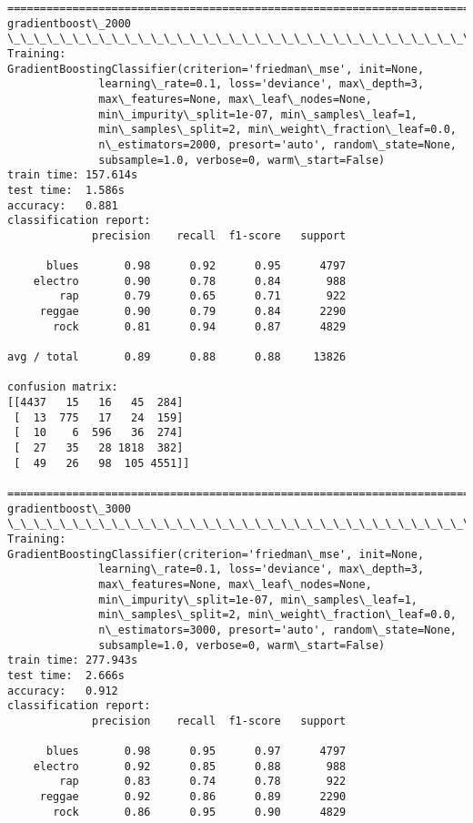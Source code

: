 \documentclass[11pt]{article}
\begin{document}
\begin{Verbatim}[commandchars=\\\{\}]
================================================================================
gradientboost\_2000
\_\_\_\_\_\_\_\_\_\_\_\_\_\_\_\_\_\_\_\_\_\_\_\_\_\_\_\_\_\_\_\_\_\_\_\_\_\_\_\_\_\_\_\_\_\_\_\_\_\_\_\_\_\_\_\_\_\_\_\_\_\_\_\_\_\_\_\_\_\_\_\_\_\_\_\_\_\_\_\_
Training: 
GradientBoostingClassifier(criterion='friedman\_mse', init=None,
              learning\_rate=0.1, loss='deviance', max\_depth=3,
              max\_features=None, max\_leaf\_nodes=None,
              min\_impurity\_split=1e-07, min\_samples\_leaf=1,
              min\_samples\_split=2, min\_weight\_fraction\_leaf=0.0,
              n\_estimators=2000, presort='auto', random\_state=None,
              subsample=1.0, verbose=0, warm\_start=False)
train time: 157.614s
test time:  1.586s
accuracy:   0.881
classification report:
             precision    recall  f1-score   support

      blues       0.98      0.92      0.95      4797
    electro       0.90      0.78      0.84       988
        rap       0.79      0.65      0.71       922
     reggae       0.90      0.79      0.84      2290
       rock       0.81      0.94      0.87      4829

avg / total       0.89      0.88      0.88     13826

confusion matrix:
[[4437   15   16   45  284]
 [  13  775   17   24  159]
 [  10    6  596   36  274]
 [  27   35   28 1818  382]
 [  49   26   98  105 4551]]

================================================================================
gradientboost\_3000
\_\_\_\_\_\_\_\_\_\_\_\_\_\_\_\_\_\_\_\_\_\_\_\_\_\_\_\_\_\_\_\_\_\_\_\_\_\_\_\_\_\_\_\_\_\_\_\_\_\_\_\_\_\_\_\_\_\_\_\_\_\_\_\_\_\_\_\_\_\_\_\_\_\_\_\_\_\_\_\_
Training: 
GradientBoostingClassifier(criterion='friedman\_mse', init=None,
              learning\_rate=0.1, loss='deviance', max\_depth=3,
              max\_features=None, max\_leaf\_nodes=None,
              min\_impurity\_split=1e-07, min\_samples\_leaf=1,
              min\_samples\_split=2, min\_weight\_fraction\_leaf=0.0,
              n\_estimators=3000, presort='auto', random\_state=None,
              subsample=1.0, verbose=0, warm\_start=False)
train time: 277.943s
test time:  2.666s
accuracy:   0.912
classification report:
             precision    recall  f1-score   support

      blues       0.98      0.95      0.97      4797
    electro       0.92      0.85      0.88       988
        rap       0.83      0.74      0.78       922
     reggae       0.92      0.86      0.89      2290
       rock       0.86      0.95      0.90      4829


\end{Verbatim}
\end{document}
